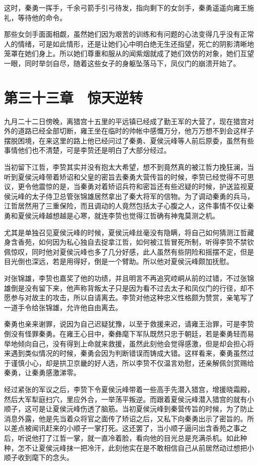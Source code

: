 这时，秦勇一挥手，千余弓箭手引弓待发，指向剩下的女剑手，秦勇遥遥向雍王施礼，等待他的命令。

那些女剑手面面相觑，虽然她们因为艰苦的训练和有问题的心法变得几乎没有正常人的情绪，可是如此情形，还是让她们心中明白绝无生还指望，死亡的阴影清晰地笼罩在她们身上。所以她们尊重和服从的闻紫烟就成了她们效仿的对象，她们互望一眼，同时举剑自尽，随着这些女子的身躯坠落马下，凤仪门的崩溃开始了。

\chapter{第三十三章　惊天逆转}

九月二十二日傍晚，离猎宫十五里的平远镇已经成了勤王军的大营了，现在猎宫对外的道路已经全部切断，雍王坐在临时的帅帐中感慨万分，他万万想不到会这样子摆脱困境，在来这里的路上他已经问过了秦勇、夏侯沅峰等人前后原委，虽然有些事情他们也不清楚，可是李贽还是明白了大部分经过。

当初留下江哲，李贽其实并没有抱太大希望，想不到竟然真的被江哲力挽狂澜，当听到夏侯沅峰带着矫诏和父皇的密旨去秦勇大营传旨的时候，李贽已经觉得不可思议，更令他震惊的是，当秦勇对着矫诏兵符和密旨还有些迟疑的时候，护送监视夏侯沅峰的太子侍卫总管张锦雄居然拿出了秦大将军的信物。为了调动秦勇的兵马，江哲居然用了三重保险，而且调动的人竟然包括太子心腹之人，这件事情不仅让秦勇和夏侯沅峰越想越是心寒，就连李贽也觉得江哲确有神鬼莫测之机。

尤其是单独召见夏侯沅峰的时候，夏侯沅峰丝毫没有隐瞒，将自己如何猜测江哲藏身含香苑，如何因为私心独自去捉拿江哲，如何被江哲冒死所制，听得李贽不禁钦佩惊叹，同时他对夏侯沅峰也多了几分好感，此人虽然有些阴险和摇摆不定，但是目光倒也深远，若是用得好，倒是一个臂助。所以他对夏侯沅峰颇加抚慰。

对张锦雄，李贽也嘉奖了他的功绩，并且明言不再追究崆峒从前的过错，不过张锦雄倒是没有留下来，他声称背叛太子只是因为看不过去太子和凤仪门的行径，却不愿参与对故主的攻击，所以自请离去。李贽对他这种忠义性格颇为赞赏，亲笔写了一道手令给张锦雄，允许他自由离去。

秦勇也亲来谢罪，说因为自己迟疑犹豫，以至于救援来迟，请雍王治罪，可是李贽倒没有怪罪秦勇。在雍王心目中，秦彝麾下军队既然只忠于朝廷，若是秦勇轻而易举地倾向自己，没有得到上命就来救援，虽然此刻他会觉得感激，但是却会担心将来遇到类似情况的时候，秦勇会因为判断错误而铸成大错。这样看来，秦勇虽然过于谨慎小心，却是拱卫京畿的好人选，所以李贽不仅温言劝慰，还亲解佩剑赏赐给秦勇，让秦勇感激涕零。

经过紧张的军议之后，李贽下令夏侯沅峰带着一些高手先潜入猎宫，增援晓霜殿，然后大军犁庭扫穴，里应外合，一举荡平叛逆。而跟着夏侯沅峰潜入猎宫的就有小顺子，这可是让夏侯沅峰伤透了脑筋。当初夏侯沅峰到秦营传旨的时候，为了防止消息外露，他是先当着众将官之面传了矫诏之后，又私下向秦勇出示了密旨的。所以差点被闻讯赶来的小顺子一掌打死。这还罢了，当小顺子逼问出含香苑之事之后，听说他打了江哲一掌，就一直冷着脸，看向他的目光总是充满杀机。如此种种，怎不让夏侯沅峰抹一把冷汗，此刻他实在是不敢相信自己从前居然动过想把小顺子收到麾下的念头。

